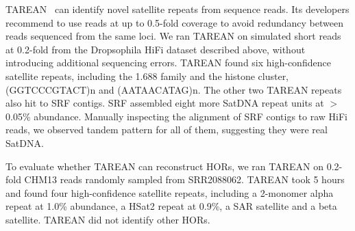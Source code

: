 \documentclass{bioinfo}
\begin{document}
TAREAN~\citep{Novak:2017wx} can identify novel satellite repeats from sequence
reads. Its developers recommend to use reads at up to 0.5-fold coverage to
avoid redundancy between reads sequenced from the same loci. We
ran TAREAN on simulated short reads at 0.2-fold from the Dropsophila HiFi
dataset described above, without introducing additional sequencing errors.
TAREAN found six high-confidence satellite repeats, including the 1.688 family
and the histone cluster, (GGTCCCGTACT)n and (AATAACATAG)n. The other two TAREAN
repeats also hit to SRF contigs. SRF assembled eight more SatDNA repeat units
at $>$0.05\% abundance. Manually inspecting the alignment of SRF contigs to raw HiFi reads,
we observed tandem pattern for all of them, suggesting they were real SatDNA.

To evaluate whether TAREAN can reconstruct HORs, we ran TAREAN on 0.2-fold
CHM13 reads randomly sampled from SRR2088062. TAREAN took 5 hours and found
four high-confidence satellite repeats, including a 2-monomer alpha repeat at
1.0\% abundance, a HSat2 repeat at 0.9\%, a SAR satellite and a beta satellite.
TAREAN did not identify other HORs.

%
%
\end{document}
